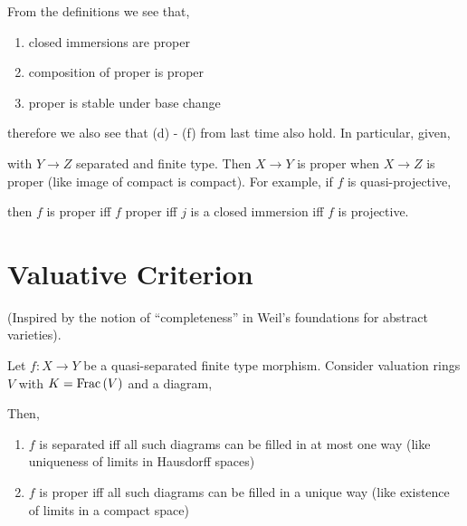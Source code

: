 \documentclass[12pt]{article}
\begin{document}
\begin{rmk}
From the definitions we see that,
\begin{enumerate}
\item closed immersions are proper
\item composition of proper is proper
\item proper is stable under base change
\end{enumerate}
therefore we also see that (d) - (f) from last time also hold. In particular, given,
\begin{center}
\end{center}
with $Y \to Z$ separated and finite type. Then $X \to Y$ is proper when $X \to Z$ is proper (like image of compact is compact). For example, if $f$ is quasi-projective,
\begin{center}
\end{center}
then $f$ is proper iff $f$ proper iff $j$ is a closed immersion iff $f$ is projective. 
\end{rmk}

\section{Valuative Criterion}

(Inspired by the notion of ``completeness'' in Weil's foundations for abstract varieties). 

\begin{thm}
Let $f : X \to Y$ be a quasi-separated finite type morphism. Consider valuation rings $V$ with $K = \mathrm{Frac}\left(V\right)$ and a diagram,
\begin{center}
\end{center}
Then,
\begin{enumerate}
\item $f$ is separated iff all such diagrams can be filled in at most one way (like uniqueness of limits in Hausdorff spaces)
\item $f$ is proper iff all such diagrams can be filled in a unique way (like existence of limits in a compact space)
\end{enumerate}
\end{thm}
\end{document}
